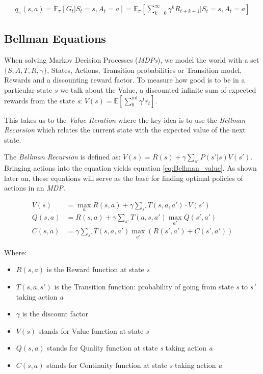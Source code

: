 \documentclass[paper=a4,fontsize=11pt]{scrartcl} %
\numberwithin{equation}{section} %
\numberwithin{figure}{section} %
\numberwithin{table}{section} %
\begin{document}
\begin{align}
    q_{\pi}(s, a) = \mathbb{E}_{\pi} \left[ G_t | S_t=s, A_t=a \right] = 
    \mathbb{E}_{\pi} \left[ \sum_{k=0}^{\infty} \gamma^k R_{t+k+1} | S_t=s, A_t=a \right]
    \label{eq:action-value_function}
\end{align}


\subsection{Bellman Equations}

When solving Markov Decision Processes (\textit{MDPs}), we model the world with a set $\{S,A,T,R,\gamma\}$, 
States, Actions, Transition probabilities or Transition model, Rewards and a discounting reward factor.
To measure how good is to be in a particular state $s$ we talk about the Value, a discounted infinite sum of
expected rewards from the state \textit{s}: $V(s) = \mathbb{E} \left[ \sum_{0}^{\inf} \gamma^t r_t \right]$.

This takes us to the \textit{Value Iteration} where the key idea is to use the \textit{Bellman Recursion}
which relates the current state with the expected value of the next state.

The \textit{Bellman Recursion} is defined as: $V(s) = R(s) + \gamma \sum_{s'} P(s'|s) V(s') $.
Bringing actions into the equation yields equation \ref{eq:Bellman_value}.
As shown later on, these equations will serve as the base for finding 
optimal policies of actions in an \textit{MDP}.

\begin{align}
    V(s) &= \max_a R(s,a) + \gamma \sum_{s'} T(s,a,a') \cdot V(s') 
    \label{eq:Bellman_value} \\	
    Q(s,a) &= R(s,a) + \gamma \sum_{s'} T(a,s,a') \max_{a'} Q(s',a') 
    \label{eq:Bellman_quality} \\
    C(s,a) &= \gamma \sum_{s'} T(s,a,a') \max_{a'} (R(s',a') + C(s',a')) 
    \label{Bellman_continuity}
\end{align}

Where:
\begin{itemize}
	\item $R(s,a)$ is the Reward function at state \textit{s}
    \item $T(s,a,s')$ is the Transition function: probability of going 
    	from state \textit{s} to \textit{s'} taking action \textit{a}
    \item $\gamma$ is the discount factor
	\item $V(s)$ stands for Value function at state \textit{s}
    \item $Q(s,a)$ stands for Quality function at state \textit{s} taking action \textit{a}
    \item $C(s,a)$ stands for Continuity function at state \textit{s} taking action \textit{a}
\end{itemize}
\end{document}

